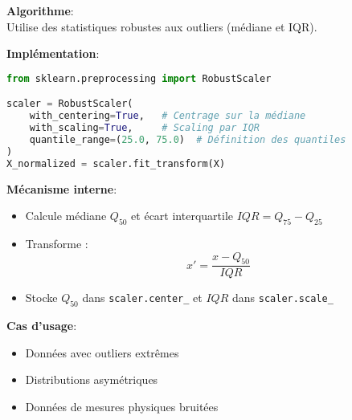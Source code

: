\documentclass{article}
\begin{document}
\textbf{Algorithme}: \\
Utilise des statistiques robustes aux outliers (médiane et IQR).

\textbf{Implémentation}: \\
\begin{lstlisting}[language=Python]
from sklearn.preprocessing import RobustScaler

scaler = RobustScaler(
    with_centering=True,   # Centrage sur la médiane
    with_scaling=True,     # Scaling par IQR
    quantile_range=(25.0, 75.0)  # Définition des quantiles
)
X_normalized = scaler.fit_transform(X)
\end{lstlisting}

\textbf{Mécanisme interne}: \\
\begin{itemize}
    \item Calcule médiane $Q_{50}$ et écart interquartile $IQR = Q_{75} - Q_{25}$
    \item Transforme :
    \[
    x' = \frac{x - Q_{50}}{IQR}
    \]
    \item Stocke $Q_{50}$ dans \texttt{scaler.center\_} et $IQR$ dans \texttt{scaler.scale\_}
\end{itemize}

\textbf{Cas d'usage}: \\
\begin{itemize}
    \item Données avec outliers extrêmes
    \item Distributions asymétriques
    \item Données de mesures physiques bruitées
\end{itemize}
\end{document}
